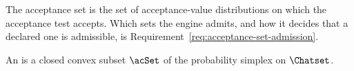
The acceptance set is the set of acceptance-value distributions on which the
acceptance test accepts. Which sets the engine admits, and how it decides
that a declared one is admissible, is Requirement~\ref{req:acceptance-set-admission}.

\begin{definition}\label{def:admissible-acceptance-set}
An 
is a closed convex subset $\acSet$ of the probability simplex on $\Chatset$.
\end{definition}
